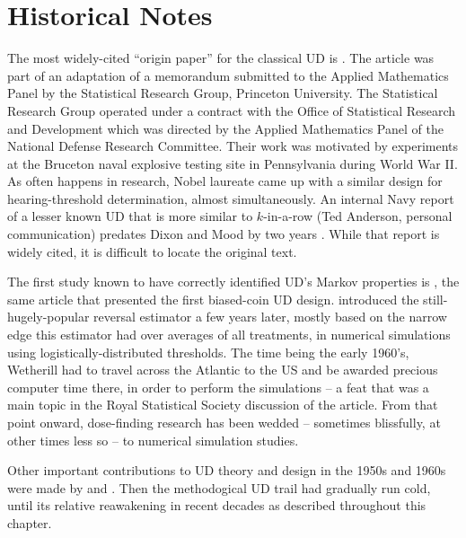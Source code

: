 \section{Historical Notes}\label{sec:history}

The most widely-cited ``origin paper'' for the classical UD is \cite{Dixo:Mood:Amet:1948}. The article was part of an adaptation of a memorandum submitted to the Applied Mathematics Panel by the Statistical Research Group, Princeton University.  The Statistical Research Group operated under a contract with the Office of Statistical Research and Development which was directed by the Applied Mathematics Panel of the National Defense Research Committee.  Their work was motivated by experiments at the Bruceton naval explosive testing site in Pennsylvania during World War II. As often happens in research, Nobel laureate \cite{vonB:anew:1947} came up with a similar design for hearing-threshold determination, almost simultaneously.  An internal Navy report of a lesser known UD that is more similar to $k$-in-a-row (Ted Anderson, personal communication) predates Dixon and Mood by two years  \citep{Ande:McCa:Tuke:Stai:1946}. While that report is widely cited, it is difficult to locate the original text.

The first study known to have correctly identified UD's Markov properties is \cite{Derm:Nonp:1957}, the same article that presented the first biased-coin UD design. \cite{Weth:Chen:Vasu:est:1966} introduced the still-hugely-popular reversal estimator a few years later, mostly based on the narrow edge this estimator had over averages of all treatments, in numerical simulations using logistically-distributed thresholds. The time being the early 1960's, Wetherill had to travel across the Atlantic to the US and be awarded precious computer time there, in order to perform the simulations -- a feat that was a main topic in the Royal Statistical Society discussion of the \cite{Weth:Sequ:1963} article. From that point onward, dose-finding research has been wedded -- sometimes blissfully, at other times less so -- to numerical simulation studies.

Other important contributions to UD theory and design in the 1950s and 1960s were made by \cite{BrownleeEtAl53} and \cite{Tsut:asym:1967,Tsut:rand:1967}. Then the methodogical UD trail had gradually run cold, until its relative reawakening in recent decades as described throughout this chapter.

